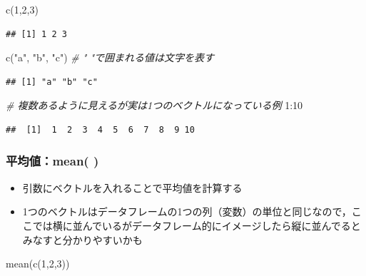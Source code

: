\documentclass[
  xelatex,ja=standard, b5paper]{bxjsbook}
\newenvironment{Shaded}{\begin{snugshade}}{\end{snugshade}}
\newcommand{\CommentTok}[1]{\textcolor[rgb]{0.56,0.35,0.01}{\textit{#1}}}
\newcommand{\DecValTok}[1]{\textcolor[rgb]{0.00,0.00,0.81}{#1}}
\newcommand{\FunctionTok}[1]{\textcolor[rgb]{0.00,0.00,0.00}{#1}}
\newcommand{\NormalTok}[1]{#1}
\newcommand{\SpecialCharTok}[1]{\textcolor[rgb]{0.00,0.00,0.00}{#1}}
\newcommand{\StringTok}[1]{\textcolor[rgb]{0.31,0.60,0.02}{#1}}
\providecommand{\tightlist}{%
  \setlength{\itemsep}{0pt}\setlength{\parskip}{0pt}}
\begin{document}
\begin{Shaded}
\begin{Highlighting}[]
\FunctionTok{c}\NormalTok{(}\DecValTok{1}\NormalTok{,}\DecValTok{2}\NormalTok{,}\DecValTok{3}\NormalTok{)}
\end{Highlighting}
\end{Shaded}

\begin{verbatim}
## [1] 1 2 3
\end{verbatim}

\begin{Shaded}
\begin{Highlighting}[]
\FunctionTok{c}\NormalTok{(}\StringTok{"a"}\NormalTok{, }\StringTok{"b"}\NormalTok{, }\StringTok{"c"}\NormalTok{) }\CommentTok{\# " "で囲まれる値は文字を表す}
\end{Highlighting}
\end{Shaded}

\begin{verbatim}
## [1] "a" "b" "c"
\end{verbatim}

\begin{Shaded}
\begin{Highlighting}[]
\CommentTok{\# 複数あるように見えるが実は1つのベクトルになっている例}
\DecValTok{1}\SpecialCharTok{:}\DecValTok{10}
\end{Highlighting}
\end{Shaded}

\begin{verbatim}
##  [1]  1  2  3  4  5  6  7  8  9 10
\end{verbatim}

\hypertarget{p-function-ex-m}{%
\subsubsection{平均値：mean( )}\label{p-function-ex-m}}

\begin{itemize}
\tightlist
\item
  引数にベクトルを入れることで平均値を計算する
\item
  1つのベクトルはデータフレームの1つの列（変数）の単位と同じなので，ここでは横に並んでいるがデータフレーム的にイメージしたら縦に並んでるとみなすと分かりやすいかも
\end{itemize}

\begin{Shaded}
\begin{Highlighting}[]
\FunctionTok{mean}\NormalTok{(}\FunctionTok{c}\NormalTok{(}\DecValTok{1}\NormalTok{,}\DecValTok{2}\NormalTok{,}\DecValTok{3}\NormalTok{))}
\end{Highlighting}
\end{Shaded}
\end{document}
